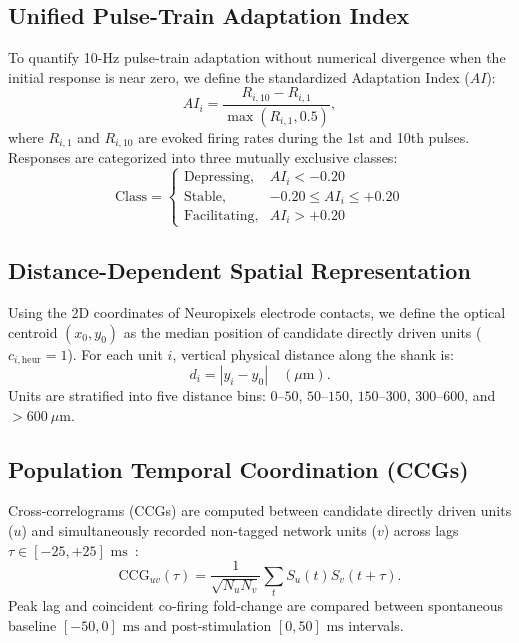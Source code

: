 \documentclass[10pt,journal,compsoc]{IEEEtran}
\begin{document}
\subsection{Unified Pulse-Train Adaptation Index}
To quantify 10-Hz pulse-train adaptation without numerical divergence when the initial response is near zero, we define the standardized Adaptation Index ($AI$):
\begin{equation}
    AI_i = \frac{R_{i,10} - R_{i,1}}{\max(R_{i,1}, 0.5)},
\end{equation}
where $R_{i,1}$ and $R_{i,10}$ are evoked firing rates during the 1st and 10th pulses. Responses are categorized into three mutually exclusive classes:
\begin{equation}
    \text{Class} = \begin{cases}
        \text{Depressing}, & AI_i < -0.20 \\
        \text{Stable}, & -0.20 \le AI_i \le +0.20 \\
        \text{Facilitating}, & AI_i > +0.20
    \end{cases}
\end{equation}

\subsection{Distance-Dependent Spatial Representation}
Using the 2D coordinates of Neuropixels electrode contacts, we define the optical centroid $(x_0, y_0)$ as the median position of candidate directly driven units ($c_{i,\text{heur}}=1$). For each unit $i$, vertical physical distance along the shank is:
\begin{equation}
    d_i = |y_i - y_0| \quad (\mu\text{m}).
\end{equation}
Units are stratified into five distance bins: $0–50$, $50–150$, $150–300$, $300–600$, and $>600\ \mu\text{m}$.

\subsection{Population Temporal Coordination (CCGs)}
Cross-correlograms (CCGs) are computed between candidate directly driven units ($u$) and simultaneously recorded non-tagged network units ($v$) across lags $\tau \in [-25, +25]\text{ ms}$~\cite{cohen2011measuring}:
\begin{equation}
    \text{CCG}_{uv}(\tau) = \frac{1}{\sqrt{N_u N_v}} \sum_{t} S_u(t) S_v(t + \tau).
\end{equation}
Peak lag and coincident co-firing fold-change are compared between spontaneous baseline $[-50, 0]\text{ ms}$ and post-stimulation $[0, 50]\text{ ms}$ intervals.
\end{document}
